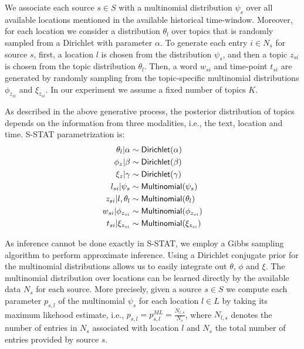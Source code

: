 \documentclass{sig-alternate}
\newcommand{\model}{{S-STAT}\xspace} %
\begin{document}
We associate each source $s \in S$ with a multinomial distribution $\psi_s$ over all available locations mentioned in the available historical time-window. Moreover, for each location we consider a distribution $\theta_l$ over topics that is randomly sampled from a Dirichlet with parameter $\alpha$. To generate each entry $i \in N_s$ for source $s$, first, a location $l$ is chosen from the distribution $\psi_s$, and then a topic $z_{si}$ is chosen from the topic distribution $\theta_l$. Then, a word $w_{si}$ and time-point $t_{si}$ are generated by randomly sampling from the topic-specific multinomial distributions $\phi_{z_{si}}$ and $\xi_{z_{si}}$.  In our experiment we assume a fixed number of topics $K$.

As described in the above generative process, the posterior distribution of topics depends on the information from three modalities, i.e., the text, location and time. \model parametrization is:
\begin{align}
\theta_{l}|\alpha & \sim {\sf Dirichlet}(\alpha) \nonumber \\
\phi_{z}|\beta & \sim {\sf Dirichlet}(\beta) \nonumber \\ 
\xi_{z}|\gamma & \sim {\sf Dirichlet}(\gamma) \nonumber \\
l_{si}|\psi_s & \sim {\sf Multinomial}(\psi_s)  \nonumber \\
z_{si}|l,\theta_{l} & \sim {\sf Multinomial}(\theta_l) \nonumber \\
w_{si}|\phi_{z_{si}} & \sim {\sf Multinomial}(\phi_{z_{si}}) \nonumber \\
t_{si}|\xi_{z_{si}} & \sim {\sf Multinomial}(\xi_{z_{si}}) \nonumber
\end{align}

As inference cannot be done exactly in \model, we employ a Gibbs sampling algorithm to perform approximate inference. Using a Dirichlet conjugate prior for the multinomial distributions allows us to easily integrate out $\theta$, $\phi$ and $\xi$. The multinomial distribution over locations can be learned directly by the available data $N_s$ for each source. More precisely, given a source $s \in S$ we compute each parameter $p_{s,l}$ of the multinomial $\psi_s$  for each location $l \in L$ by taking its maximum likehood estimate, i.e., $p_{s,l} = {p}^{ML}_{s,l} = \frac{N_{l,s}}{N_{s}}$, where $N_{l,s}$ denotes the number of entries in $N_s$ associated with location $l$ and $N_s$ the total number of entries provided by source $s$.
\end{document}
